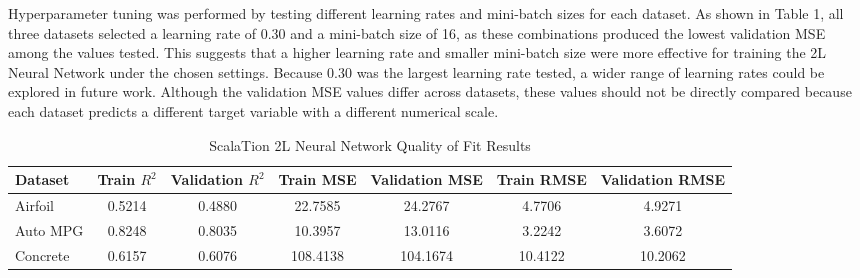 \documentclass{article}
\begin{document}
Hyperparameter tuning was performed by testing different learning rates and mini-batch sizes for each dataset. As shown in Table 1, all three datasets selected a learning rate of 0.30 and a mini-batch size of 16, as these combinations produced the lowest validation MSE among the values tested. This suggests that a higher learning rate and smaller mini-batch size were more effective for training the 2L Neural Network under the chosen settings. Because 0.30 was the largest learning rate tested, a wider range of learning rates could be explored in future work. Although the validation MSE values differ across datasets, these values should not be directly compared because each dataset predicts a different target variable with a different numerical scale.
\medskip
\begin{table}[H]
    \centering
    \caption{ScalaTion 2L Neural Network Quality of Fit Results}
    \label{tab:scala_qof}
    \small
    \begin{tabular}{lcccccc}
        \hline
        \textbf{Dataset} & \textbf{Train $R^2$} & \textbf{Validation $R^2$} & \textbf{Train MSE} & \textbf{Validation MSE} & \textbf{Train RMSE} & \textbf{Validation RMSE} \\
        \hline
        Airfoil  & 0.5214 & 0.4880 & 22.7585 & 24.2767 & 4.7706 & 4.9271 \\
        Auto MPG & 0.8248 & 0.8035 & 10.3957 & 13.0116 & 3.2242 & 3.6072 \\
        Concrete & 0.6157 & 0.6076 & 108.4138 & 104.1674 & 10.4122 & 10.2062 \\
        \hline
    \end{tabular}
\end{table}
\end{document}
